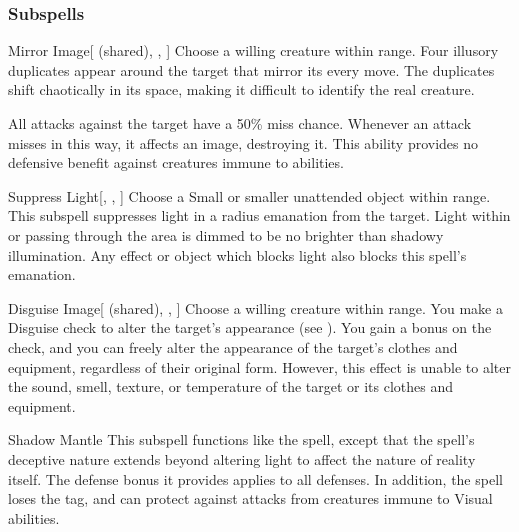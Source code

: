 \subsubsection{Subspells}


\begin{ability}[\nth{2}]{Mirror Image}[ (shared), , ]
Choose a willing creature within \rngclose range.
Four illusory duplicates appear around the target that mirror its every move.
The duplicates shift chaotically in its space, making it difficult to identify the real creature.

All  attacks against the target have a 50\% miss chance.
Whenever an attack misses in this way, it affects an image, destroying it.
This ability provides no defensive benefit against creatures immune to  abilities.
\end{ability}
\vspace{0.25em}


\begin{ability}[\nth{2}]{Suppress Light}[, , ]
Choose a Small or smaller unattended object within \rngclose range.
This subspell suppresses light in a \areamed radius emanation from the target.
Light within or passing through the area is dimmed to be no brighter than shadowy illumination.
Any effect or object which blocks light also blocks this spell's emanation.
\end{ability}
\vspace{0.25em}


\begin{ability}[\nth{3}]{Disguise Image}[ (shared), , ]
Choose a willing creature within \rngclose range.
You make a Disguise check to alter the target's appearance (see ).
You gain a  bonus on the check, and you can freely alter the appearance of the target's clothes and equipment, regardless of their original form.
However, this effect is unable to alter the sound, smell, texture, or temperature of the target or its clothes and equipment.
\end{ability}
\vspace{0.25em}


\begin{ability}[\nth{4}]{Shadow Mantle}
This subspell functions like the  spell, except that the spell's deceptive nature extends beyond altering light to affect the nature of reality itself.
The defense bonus it provides applies to all defenses.
In addition, the spell loses the  tag, and can protect against attacks from creatures immune to Visual abilities.
\end{ability}
\vspace{0.25em}


